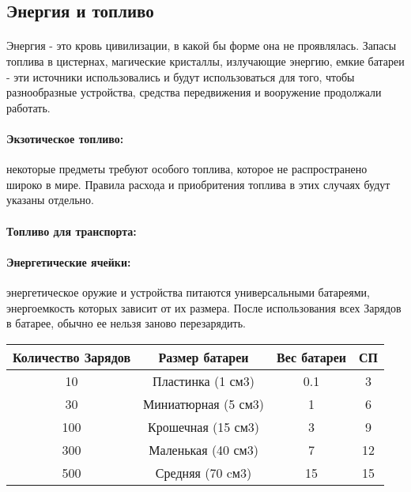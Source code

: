 \subsection{Энергия и топливо}
\paragraph{}
Энергия - это кровь цивилизации, в какой бы форме она не проявлялась. Запасы топлива в цистернах, магические кристаллы, излучающие энергию, емкие батареи - эти источники использовались и будут использоваться для того, чтобы разнообразные устройства, средства передвижения и вооружение продолжали работать.

\paragraph{Экзотическое топливо:} некоторые предметы требуют особого топлива, которое не распространено широко в мире. Правила расхода и приобритения топлива в этих случаях будут указаны отдельно.

\paragraph{Топливо для транспорта:} \tbd

\paragraph{Энергетические ячейки:} энергетическое оружие и устройства питаются универсальными батареями, энергоемкость которых зависит от их размера. После использования всех Зарядов в батарее, обычно ее нельзя заново перезарядить.
\begin{center}
\begin{tabular}{|c|c|c|c|}
\hline
Количество Зарядов & Размер батареи & Вес батареи & СП \\ \hline
10 & Пластинка (1 см3) & 0.1 & 3 \\ \hline
30 & Миниатюрная (5 см3) & 1 & 6 \\ \hline
100 & Крошечная (15 см3) & 3 & 9 \\ \hline
300 & Маленькая (40 см3) & 7 & 12 \\ \hline
500 & Средняя (70 cм3) & 15 & 15 \\ \hline
\end{tabular}
\end{center}

